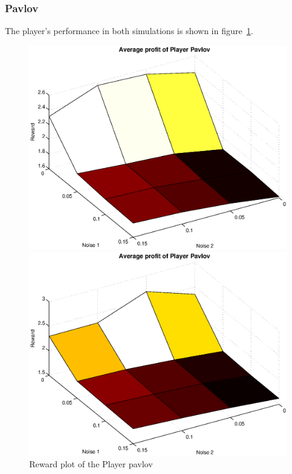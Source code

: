 \subsubsection{Pavlov}
The player's performance in both simulations is shown in figure~\ref{pic player pavlov}.\\
\begin{figure}[h]

\begin{minipage}[hbt]{0.65\textwidth}
	\centering
	\includegraphics[width=\textwidth]{pics/simulation1/Reward_vs_Noise_of_Player_Pavlov}
\end{minipage}
\hfill
\begin{minipage}[hbt]{0.3\textwidth}
	\centering
	\includegraphics[width=\textwidth]{pics/simulation2/Reward_vs_Noise_of_Player_Pavlov}
\end{minipage}
	\caption{Reward plot of the Player pavlov}
	\label{pic player pavlov}
\end{figure}

